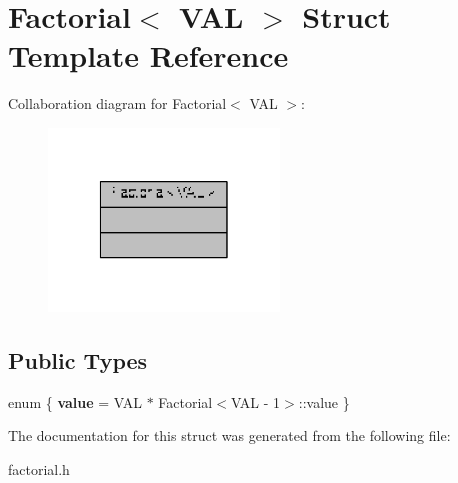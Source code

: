 \hypertarget{structFactorial}{\section{Factorial$<$ V\-A\-L $>$ Struct Template Reference}
\label{structFactorial}
}


Collaboration diagram for Factorial$<$ V\-A\-L $>$\-:
\nopagebreak
\begin{figure}[H]
\begin{center}
\leavevmode
\includegraphics[width=174pt]{structFactorial__coll__graph}
\end{center}
\end{figure}
\subsection*{Public Types}
\begin{DoxyCompactItemize}
\item 
enum \{ {\bfseries value} = V\-A\-L $\ast$ Factorial$<$V\-A\-L -\/ 1$>$\-:\-:value
 \}
\end{DoxyCompactItemize}


The documentation for this struct was generated from the following file\-:\begin{DoxyCompactItemize}
\item 
factorial.\-h\end{DoxyCompactItemize}
